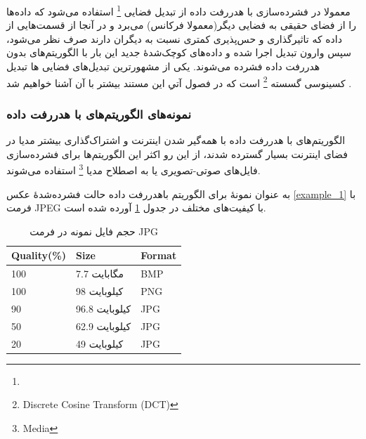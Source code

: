 معمولا در فشرده‌سازی با هدررفت داده از تبدیل‌‌ فضایی 
\footnote{}
استفاده می‌شود که داده‌ها را از فضای حقیقی به فضایی دیگر(معمولا فرکانس) می‌برد و در آنجا از قسمت‌هایی از داده که تاثیرگذاری و حس‌پذیری کمتری
نسبت به دیگران دارند صرف نظر می‌شود، سپس وارون تبدیل اجرا شده و داده‌های کوچک‌شدهٔ جدید این بار با الگوریتم‌های 
بدون هدررفت داده فشرده می‌شوند. یکی از 
مشهورترین
تبدیل‌های فضایی
ها تبدیل کسینوسی گسسته
\footnote{Discrete Cosine Transform (DCT)}
است که در فصول آتیِ این مستند بیشتر با آن آشنا خواهیم شد
\cite{dct}.
\subsubsection{نمونه‌های الگوریتم‌های با هدررفت داده}
الگوریتم‌های با هدررفت داده با همه‌گیر شدن اینترنت و اشتراک‌گذاری 
بیشتر مدیا در فضای اینترنت بسیار گسترده شدند، از این رو اکثر این الگوریتم‌ها برای فشرده‌سازی فایل‌های صوتی-تصویری یا به اصطلاح 
مدیا  \footnote{Media}
استفاده می‌شوند. 

به عنوان نمونهٔ برای الگوریتم باهدررفت داده 
حالت فشرده‌شدهٔ عکس 
\ref{example_1}
با فرمت JPEG 
با کیفیت‌های مختلف در جدول 
\ref{compare_2}
آورده شده است.

\begin{table}[h]
	\centering
	\caption{حجم فایل نمونه در فرمت JPG}
	\label{compare_2}
	\begin{tabular}{@{}lll@{}}
	\toprule
	Quality(\%) & Size & Format \\ \midrule
	100 & 7.7 مگابایت & BMP \\
	100 & 98 کیلوبایت & PNG \\
	90 & 96.8 کیلوبایت & JPG \\
	50 & 62.9 کیلوبایت & JPG \\
	20 & 49  کیلوبایت& JPG \\ \bottomrule
	\end{tabular}
	\end{table}



